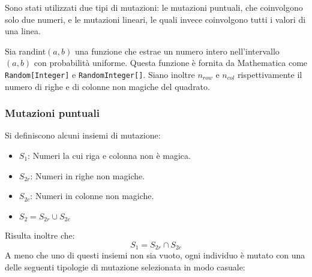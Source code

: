 \documentclass[italian,twoside,twocolumn]{article}
\begin{document}
Sono stati utilizzati due tipi di mutazioni: le mutazioni puntuali, che coinvolgono solo due numeri, e le mutazioni lineari, le quali invece coinvolgono tutti i valori di una linea.	

Sia randint$ (a,b) $ una funzione che estrae un numero intero nell'intervallo $ (a,b) $ con probabilità uniforme. Questa funzione è fornita da Mathematica come \texttt{Random[Integer]} e \texttt{RandomInteger[]}. Siano inoltre $ n_{row} $ e $ n_{col} $ rispettivamente il numero di righe e di colonne non magiche del quadrato.

\subsubsection{Mutazioni puntuali}
Si definiscono alcuni insiemi di mutazione:
\begin{itemize}
	\item $ S_1 $:  Numeri la cui riga e colonna non è magica.
	\item $ S_{2r} $: Numeri in righe non magiche.
	\item $ S_{2c} $: Numeri in colonne non magiche.
	\item $ S_{2} = S_{2r} \cup S_{2c} $
\end{itemize}
Risulta inoltre che:
\[S_1 = S_{2r} \cap S_{2c} \]
A meno che uno di questi insiemi non sia vuoto, ogni individuo è mutato con una delle seguenti tipologie di mutazione selezionata in modo casuale:
\end{document}
